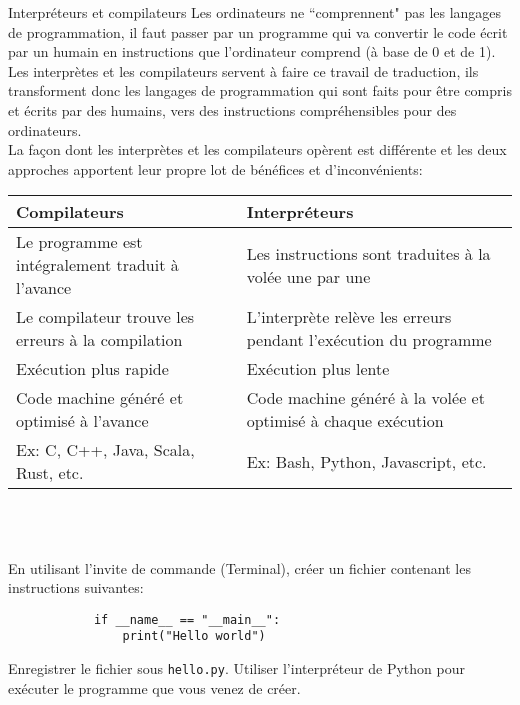 \begin{section}{Interpréteurs et compilateurs}
    Les ordinateurs ne ``comprennent" pas les langages de programmation, il faut passer par un programme qui va convertir le code écrit par un humain en instructions que l'ordinateur comprend (à base de 0 et de 1).
\\
Les interprètes et les compilateurs servent à faire ce travail de traduction, ils transforment donc les langages de programmation qui sont faits pour être compris et écrits par des humains, vers des instructions compréhensibles pour des ordinateurs.
\\
La façon dont les interprètes et les compilateurs opèrent est différente et les deux approches apportent leur propre lot de bénéfices et d'inconvénients:\\
    \begin{tabular}{| C{0.45\textwidth} | C{0.45\textwidth} |} 
        \hline
        \textbf{Compilateurs} & \textbf{Interpréteurs}\\ [0.5ex]
        \hline
        Le programme est intégralement traduit à l'avance & Les instructions sont traduites à la volée une par une  \\
        \hline
        Le compilateur trouve les erreurs à la compilation & L'interprète relève les erreurs pendant l'exécution du programme  \\
        \hline
        Exécution plus rapide & Exécution plus lente \\
        \hline
        Code machine généré et optimisé à l'avance & Code machine généré à la volée et optimisé à chaque exécution  \\
        \hline
        Ex: C, C++, Java, Scala, Rust, etc. & Ex: Bash, Python, Javascript, etc. \\
        \hline
    \end{tabular}
    \\\\
    \begin{Exercice}[10 minutes]
        En utilisant l'invite de commande (Terminal), créer un fichier contenant les instructions suivantes:
        \begin{lstlisting}
            if __name__ == "__main__":
                print("Hello world")\end{lstlisting}
        Enregistrer le fichier sous \lstinline{hello.py}. Utiliser l'interpréteur de Python pour exécuter le programme que vous venez de créer.
    \end{Exercice}
    \begin{conseil}

\end{conseil}
\end{section}
